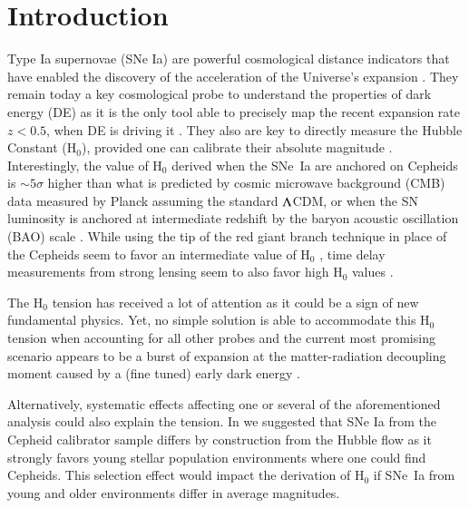 \documentclass[]{aa} %
\begin{document}
\maketitle

\section{Introduction}
Type Ia supernovae (SNe Ia) are powerful cosmological distance indicators that
have enabled the discovery of the acceleration of the Universe's expansion
\citep{riess1998, perlmutter1999}. They remain today a key cosmological probe to
understand the properties of dark energy (DE) as it is the only tool able to
precisely map the recent expansion rate $z<0.5$, when DE is driving it
\citep[e.g.][]{scolnicastro2020}. They also are key to directly measure the
Hubble Constant (H$_0$), provided one can calibrate their absolute magnitude
\citep{riess2016, freedman2019}. Interestingly, the value of H$_0$ derived when
the SNe~Ia are anchored on Cepheids \citep[the SH0ES
project][]{riess2009,riess2016} is $\sim5\sigma$ higher than what is predicted
by cosmic microwave background (CMB) data measured by Planck assuming the
standard $\Lambda$CDM, or when the SN luminosity is anchored at intermediate
redshift by the baryon acoustic oscillation (BAO) scale
\citep{riess2019,reid2019,planck2016, feeney2019}. While using the tip of the
red giant branch technique in place of the Cepheids seem to favor an
intermediate value of H$_0$ \citep{freedman2019,freedman2020}, time delay
measurements from strong lensing seem to also favor high H$_0$ values
\citep{wong2019}.

The H$_0$ tension has received a lot of attention as it could be a sign of new
fundamental physics. Yet, no simple solution is able to accommodate this H$_0$
tension when accounting for all other probes \citep{knox2019} and the current
most promising scenario appears to be a burst of expansion at the
matter-radiation decoupling moment caused by a (fine tuned) early dark energy
\citep{poulin2019}.

Alternatively, systematic effects affecting one or several of the aforementioned
analysis could also explain the tension.  In \cite{rigault2015} we suggested
that SNe Ia from the Cepheid calibrator sample differs by construction from  the
Hubble flow as it strongly favors young stellar population environments where
one could find Cepheids. This selection effect would impact the derivation of
H$_0$ if SNe~Ia from young and older environments differ in average magnitudes. 
\end{document}
